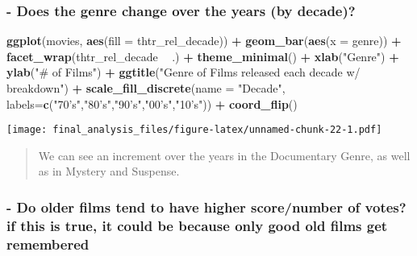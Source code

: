 \documentclass[]{article}
\newenvironment{Shaded}{\begin{snugshade}}{\end{snugshade}}
\newcommand{\DataTypeTok}[1]{\textcolor[rgb]{0.13,0.29,0.53}{#1}}
\newcommand{\KeywordTok}[1]{\textcolor[rgb]{0.13,0.29,0.53}{\textbf{#1}}}
\newcommand{\NormalTok}[1]{#1}
\newcommand{\OperatorTok}[1]{\textcolor[rgb]{0.81,0.36,0.00}{\textbf{#1}}}
\newcommand{\StringTok}[1]{\textcolor[rgb]{0.31,0.60,0.02}{#1}}
\begin{document}
\hypertarget{does-the-genre-change-over-the-years-by-decade}{%
\subsubsection{- Does the genre change over the years (by
decade)?}\label{does-the-genre-change-over-the-years-by-decade}}

\begin{Shaded}
\begin{Highlighting}[]
\KeywordTok{ggplot}\NormalTok{(movies, }\KeywordTok{aes}\NormalTok{(}\DataTypeTok{fill =}\NormalTok{ thtr_rel_decade)) }\OperatorTok{+}\StringTok{ }\KeywordTok{geom_bar}\NormalTok{(}\KeywordTok{aes}\NormalTok{(}\DataTypeTok{x =}\NormalTok{ genre)) }\OperatorTok{+}\StringTok{ }\KeywordTok{facet_wrap}\NormalTok{(thtr_rel_decade }\OperatorTok{~}\StringTok{ }\NormalTok{.) }\OperatorTok{+}\StringTok{ }\KeywordTok{theme_minimal}\NormalTok{() }\OperatorTok{+}\StringTok{ }\KeywordTok{xlab}\NormalTok{(}\StringTok{"Genre"}\NormalTok{) }\OperatorTok{+}\StringTok{ }\KeywordTok{ylab}\NormalTok{(}\StringTok{"# of Films"}\NormalTok{) }\OperatorTok{+}\StringTok{ }\KeywordTok{ggtitle}\NormalTok{(}\StringTok{"Genre of Films released each decade w/ breakdown"}\NormalTok{) }\OperatorTok{+}\StringTok{ }\KeywordTok{scale_fill_discrete}\NormalTok{(}\DataTypeTok{name =} \StringTok{"Decade"}\NormalTok{, }\DataTypeTok{labels=}\KeywordTok{c}\NormalTok{(}\StringTok{"70's"}\NormalTok{,}\StringTok{"80's"}\NormalTok{,}\StringTok{"90's"}\NormalTok{,}\StringTok{"00's"}\NormalTok{,}\StringTok{"10's"}\NormalTok{)) }\OperatorTok{+}\StringTok{ }\KeywordTok{coord_flip}\NormalTok{()}
\end{Highlighting}
\end{Shaded}

\texttt{[image: final\_analysis\_files/figure-latex/unnamed-chunk-22-1.pdf]}

\begin{quote}
We can see an increment over the years in the Documentary Genre, as well
as in Mystery and Suspense.
\end{quote}

\hypertarget{do-older-films-tend-to-have-higher-scorenumber-of-votes-if-this-is-true-it-could-be-because-only-good-old-films-get-remembered}{%
\subsubsection{- Do older films tend to have higher score/number of
votes? if this is true, it could be because only good old films get
remembered}\label{do-older-films-tend-to-have-higher-scorenumber-of-votes-if-this-is-true-it-could-be-because-only-good-old-films-get-remembered}}
\end{document}
